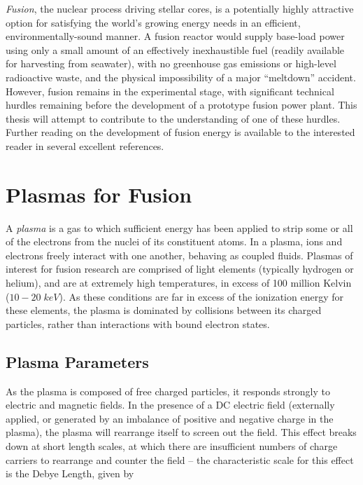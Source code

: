 \emph{Fusion}, the nuclear process driving stellar cores, is a potentially highly attractive option for satisfying the world's growing energy needs in an efficient, environmentally-sound manner.  A fusion reactor would supply base-load power using only a small amount of an effectively inexhaustible fuel (readily available for harvesting from seawater), with no greenhouse gas emissions or high-level radioactive waste, and the physical impossibility of a major ``meltdown'' accident.  However, fusion remains in the experimental stage, with significant technical hurdles remaining before the development of a prototype fusion power plant.  This thesis will attempt to contribute to the understanding of one of these hurdles.  Further reading on the development of fusion energy is available to the interested reader in several excellent references. \cite{Freidberg2007,Wesson2011,Chen1984} \nicesectionending


\section{Plasmas for Fusion}\label{sec:intro_plasmas}

A \emph{plasma} is a gas to which sufficient energy has been applied to strip some or all of the electrons from the nuclei of its constituent atoms.  In a plasma, ions and electrons freely interact with one another, behaving as coupled fluids.  Plasmas of interest for fusion research are comprised of light elements (typically hydrogen or helium), and are at extremely high temperatures, in excess of 100 million Kelvin ($10-20 \;\si{keV}$).  As these conditions are far in excess of the ionization energy for these elements, the plasma is dominated by collisions between its charged particles, rather than interactions with bound electron states.

\subsection{Plasma Parameters}\label{subsec:intro_params}

As the plasma is composed of free charged particles, it responds strongly to electric and magnetic fields.  In the presence of a DC electric field (externally applied, or generated by an imbalance of positive and negative charge in the plasma), the plasma will rearrange itself to screen out the field.  This effect breaks down at short length scales, at which there are insufficient numbers of charge carriers to rearrange and counter the field -- the characteristic scale for this effect is the Debye Length, given by

